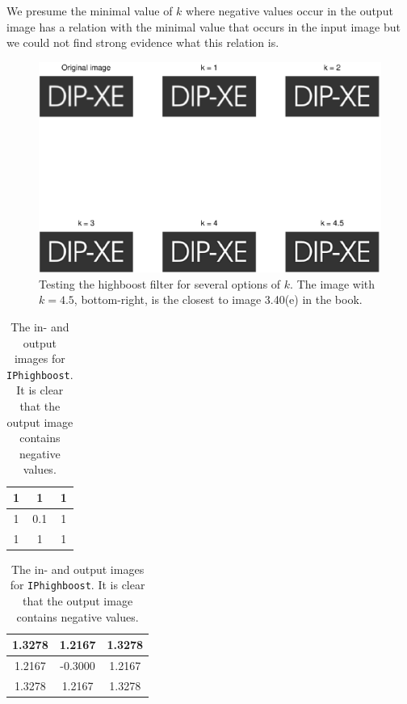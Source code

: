 We presume the minimal value of $k$ where negative values occur in the output image has a relation with the minimal value that occurs in the input image but we could not find strong evidence what this relation is. 

\begin{figure}[h]
 \centering
 \includegraphics{dipxe.eps}
 \caption{Testing the highboost filter for several options of $k$. The image with $k = 4.5$, bottom-right, is the closest to image 3.40(e) in the book.}
 \label{fig:dipxe}
\end{figure}
\begin{table}[h]
  \begin{minipage}[b]{.5\linewidth}
    \centering
    \begin{tabular}{|c|c|c|}\hline
    1 & 1 & 1 \\ \hline
    1 & 0.1 & 1 \\ \hline
    1 & 1 & 1 \\ \hline
    \end{tabular}
    \label{tbl:inImage}
  \end{minipage}
  \hfill
  \begin{minipage}[b]{.5\linewidth}
    \centering
    \begin{tabular}{|c|c|c|}\hline
      1.3278 & 1.2167 & 1.3278 \\ \hline
      1.2167 & -0.3000 & 1.2167 \\ \hline
      1.3278 & 1.2167 & 1.3278 \\ \hline
    \end{tabular}
    \label{tbl:outImage}
  \end{minipage}
  \caption{The in- and output images for \texttt{IPhighboost}. It is clear that the output image contains negative values.}
  \hfill
\end{table}
\clearpage